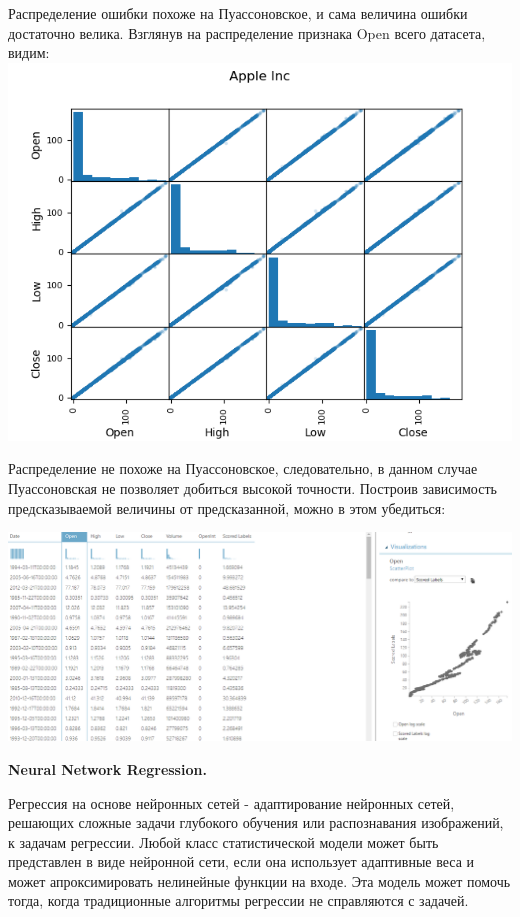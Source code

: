 Распределение ошибки похоже на Пуассоновское, и сама величина ошибки достаточно велика. Взглянув на распределение признака Open всего датасета, видим:
\includegraphics[width=0.8\linewidth]{src/pics/aapl.png}

Распределение не похоже на Пуассоновское, следовательно, в данном случае Пуассоновская не позволяет добиться высокой точности. Построив зависимость предсказываемой величины от предсказанной, можно в этом убедиться:

\includegraphics[width=1\linewidth]{src/pics/poisson3.png}

{\bfseries Neural Network Regression.}

Регрессия на основе нейронных сетей - адаптирование нейронных сетей, решающих сложные задачи глубокого обучения или распознавания изображений, к задачам регрессии. Любой класс статистической модели может быть представлен в виде нейронной сети, если она использует адаптивные веса и может апроксимировать нелинейные функции на входе. Эта модель может помочь тогда, когда традиционные алгоритмы регрессии не справляются с задачей.

